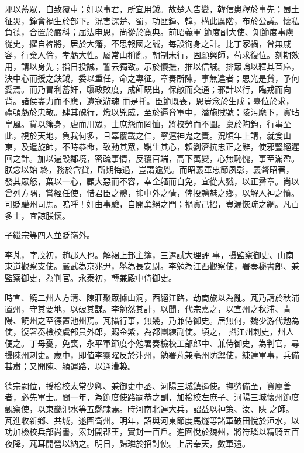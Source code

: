 \begin{pinyinscope}
 邪以蓄眾，自致覆車；奸以事君，所宜用鉞。故楚人告變，韓信患釋於事先；蜀土征災，鐘會禍生於部下。況害深楚、蜀，功匪鐘、韓，構此厲階，布於公議。懷私負德，合置於嚴科；屈法申恩，尚從於寬典。前昭義軍
 節度副大使、知節度事盧從史，擢自裨將，居於大籓，不思報國之誠，每設徇身之計。比丁家禍，曾無戚容，行棄人倫，孝虧大性。屬常山稱亂，朝制未行，固願興師，茍求復位。刻期效用，請以身先；指日投誠，誓云獨致。示於懷撫，推以信誠。排眾論以釋其苴麻，決中心而授之鈇鉞，委以重任，命之專征。章奏所陳，事無違者；恩光是貸，予何愛焉。而乃冒利蓄奸，隳政敗度，成師既出，保敵而交通；邪計以行，臨戎而向背。諸侯盡力而不應，遺寇游魂
 而是托。臣節既喪，恩豈念於生成；臺位於求，禮頓虧於忠敬。肆其醜行，熾以兇威，至於逼脅軍中，潛施賊號；陵污麾下，實玷皇風。貨以籓身，虐而用眾，士庶怨而罔恤，將校勞而不圖。稟於陶鈞，行事至此，視於天地，負我何多，且辜覆載之仁，寧逭神鬼之責。況頃年上請，就食山東，及遣旋師，不時恭命，致動其眾，覬生其心，賴劉濟抗忠正之辭，使邪豎絕遲回之計。加以遍毀鄰境，密疏事情，反覆百端，高下萬變，心無恥愧，事至滿盈。朕念以始
 終，務於含貸，所期悔過，豈謂逾兇。而昭義軍忠節夙彰，義聲昭著，發其眾怒，葉以一心，顧大惡而不容，幸全軀而自免，宜從大戮，以正彞章。尚以曾列方隅，嘗經任使，惜君臣之體，抑中外之情，俾投魑魅之鄉，以解人神之憤。可貶驩州司馬。嗚呼！奸由事驗，自開棄絕之門；禍實己招，豈漏恢疏之網。凡百多士，宜諒朕懷。



 子繼宗等四人並貶嶺外。



 李芃，字茂初，趙郡人也。解褐上邽主簿，三遷試大理評
 事，攝監察御史、山南東道觀察支使。嚴武為京兆尹，舉為長安尉。李勉為江西觀察使，署奏秘書郎、兼監察御史，為判官。永泰初，轉兼殿中侍御史。



 時宣、饒二州人方清、陳莊聚眾據山洞，西絕江路，劫商旅以為亂。芃乃請於秋浦置州，守其要地，以破其謀。李勉然其計，以聞，代宗嘉之，以宣州之秋浦、青陽、饒州之至德置池州焉。芃攝行事，無幾，乃兼侍御史。居無何，魏少游代勉為使，復署奏檢校虞部員外郎，賜金紫，為都團練副使。頃之，
 攝江州刺史，州人便之。丁母憂，免喪，永平軍節度李勉署奏檢校工部郎中、兼侍御史，為判官，尋攝陳州刺史。歲中，即值李靈曜反於汴州，勉署芃兼亳州防禦使，練達軍事，兵備甚肅；又開陳、潁運路，以通漕輓。



 德宗嗣位，授檢校太常少卿、兼御史中丞、河陽三城鎮遏使。撫勞備至，資廩善者，必先軍士。間一年，為節度使路嗣恭之副，加檢校左庶子、河陽三城懷州節度觀察使，以東畿汜水等五縣隸焉。時河南北連大兵，詔益以神策、汝、陜
 之師。芃進收新鄉、共城，遂圍衛州。明年，詔與河東節度馬燧等諸軍破田悅於洹水，以功加檢校兵部尚書，累封開郡王，實封一百戶。進圍悅於魏州，將符璘以精騎五百夜降，芃耳開營以納之。明日，歸璘於招討使。上居奉天，斂軍還。




\end{pinyinscope}
